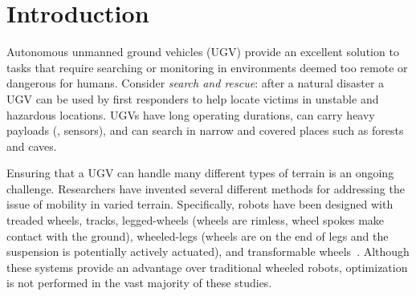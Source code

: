 

\section{Introduction}


Autonomous unmanned ground vehicles (UGV) provide an excellent solution to tasks that require searching or monitoring in environments deemed too remote or dangerous for humans.
%
Consider \emph{search and rescue}: after a natural disaster a UGV can be used by first responders to help locate victims in unstable and hazardous locations.
%
UGVs have long operating durations, can carry heavy payloads (\eg{}, sensors), and can search in narrow and covered places such as forests and caves.
%
%


Ensuring that a UGV can handle many different types of terrain is an ongoing challenge.
%
Researchers have invented several different methods for addressing the issue of mobility in varied terrain.
%
Specifically, robots have been designed with treaded wheels, tracks, legged-wheels (wheels are rimless, wheel spokes make contact with the ground), wheeled-legs (wheels are on the end of legs and the suspension is potentially actively actuated), and transformable wheels~\citep{Saranli.IntJrnRoboRes.RHex.2001,Quinn.IROS.Whegs.2002,Eich.SSRR.Stair-climb-SAR.2008,Haldane.ICRA.VelociRoACH.2013,Kenneally.IEEERobAutLetters.Legged-robots.2016}.
%
Although these systems provide an advantage over traditional wheeled robots, optimization is not performed in the vast majority of these studies.
%



